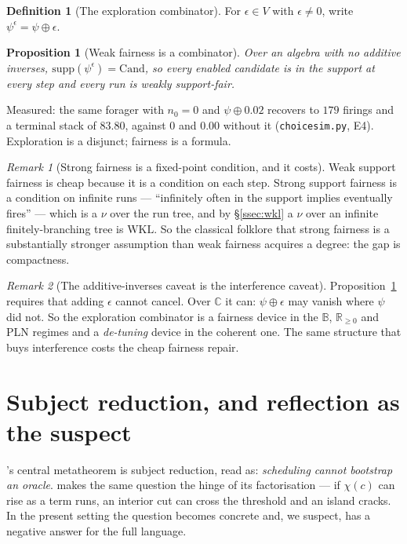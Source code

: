 \documentclass[11pt]{article}
\theoremstyle{definition}
\newtheorem{definition}{Definition}
\theoremstyle{plain}
\newtheorem{proposition}{Proposition}
\theoremstyle{remark}
\newtheorem{remark}{Remark}
\newcommand{\sumv}{\oplus}
\newcommand{\Bool}{\mathbb{B}}
\newcommand{\Rnn}{\mathbb{R}_{\geq 0}}
\newcommand{\Cx}{\mathbb{C}}
\newcommand{\Cand}{\mathrm{Cand}}
\newcommand{\WKL}{\mathrm{WKL}}
\begin{document}
\begin{definition}[The exploration combinator]\label{def:explore}
For $\epsilon \in V$ with $\epsilon \neq 0$, write $\psi^{\epsilon} = \psi \sumv
\epsilon$.
\end{definition}

\begin{proposition}[Weak fairness is a combinator]\label{prop:weakfair}
Over an algebra with no additive inverses,
$\mathrm{supp}(\psi^\epsilon) = \Cand$, so every enabled candidate is in the support at every step and every run is weakly
support-fair.
\end{proposition}

\noindent
Measured: the same forager with $n_0 = 0$ and $\psi \sumv 0.02$ recovers to $179$
firings and a terminal stack of $83.80$, against $0$ and $0.00$ without it
(\texttt{choicesim.py}, E4). Exploration is a disjunct; fairness is a formula.

\begin{remark}[Strong fairness is a fixed-point condition, and it costs]
Weak support fairness is cheap because it is a condition on each step. Strong support
fairness is a condition on infinite runs --- ``infinitely often in the support implies
eventually fires'' --- which is a $\nu$ over the run tree, and by \S\ref{ssec:wkl} a
$\nu$ over an infinite finitely-branching tree is $\WKL$. So the classical folklore
that strong fairness is a substantially stronger assumption than weak fairness acquires
a degree: the gap is compactness.
\end{remark}

\begin{remark}[The additive-inverses caveat is the interference caveat]
Proposition~\ref{prop:weakfair} requires that adding $\epsilon$ cannot cancel. Over
$\Cx$ it can: $\psi \sumv \epsilon$ may vanish where $\psi$ did not. So the exploration
combinator is a fairness device in the $\Bool$, $\Rnn$ and PLN regimes and a
\emph{de-tuning} device in the coherent one. The same structure that buys interference
costs the cheap fairness repair.
\end{remark}

\section{Subject reduction, and reflection as the suspect}\label{sec:sr}

\cite{choicesched}'s central metatheorem is subject reduction, read as: \emph{scheduling
cannot bootstrap an oracle}. \cite{agency} makes the same question the hinge of its
factorisation --- if $\chi(c)$ can rise as a term runs, an interior cut can cross the
threshold and an island cracks. In the present setting the question becomes concrete
and, we suspect, has a negative answer for the full language.
\end{document}
